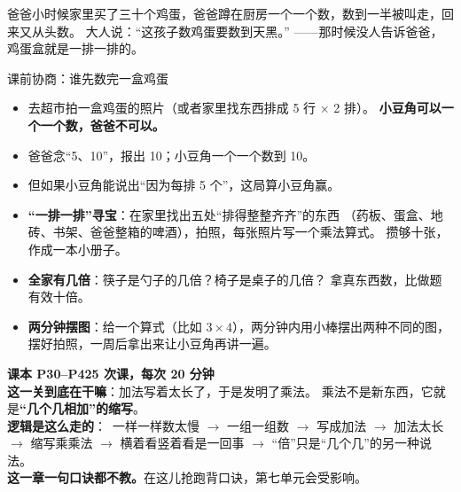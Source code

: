
\begin{blunder}
爸爸小时候家里买了三十个鸡蛋，爸爸蹲在厨房一个一个数，数到一半被叫走，回来又从头数。
大人说：“这孩子数鸡蛋要数到天黑。”
——那时候没人告诉爸爸，鸡蛋盒就是一排一排的。
\end{blunder}

\begin{gamble}{课前协商：谁先数完一盒鸡蛋}
\begin{itemize}
  \item 去超市拍一盒鸡蛋的照片（或者家里找东西排成 5 行 $\times$ 2 排）。
        \textbf{小豆角可以一个一个数，爸爸不可以。}
  \item 爸爸念“5、10”，报出 10；小豆角一个一个数到 10。
  \item 但如果小豆角能说出“因为每排 5 个”，这局算小豆角赢。
\end{itemize}
\negolines
\end{gamble}

\begin{bonus}
\begin{itemize}
  \item \textbf{“一排一排”寻宝}：在家里找出五处“排得整整齐齐”的东西
        （药板、蛋盒、地砖、书架、爸爸整箱的啤酒），拍照，每张照片写一个乘法算式。
        攒够十张，作成一本小册子。
  \item \textbf{全家有几倍}：筷子是勺子的几倍？椅子是桌子的几倍？
        拿真东西数，比做题有效十倍。
  \item \textbf{两分钟摆图}：给一个算式（比如 $3\times4$），两分钟内用小棒摆出两种不同的图，
        摆好拍照，一周后拿出来让小豆角再讲一遍。
\end{itemize}
\end{bonus}

\begin{unitinfo}
\textbf{课本 P30--P42}\quad \textbf{5 次课，每次 20 分钟} \\[4pt]
\textbf{这一关到底在干嘛}：加法写着太长了，于是发明了乘法。
乘法不是新东西，它就是\textbf{“几个几相加”的缩写}。\\
\textbf{逻辑是这么走的}：\ 一样一样数太慢 $\to$ 一组一组数 $\to$ 写成加法
$\to$ 加法太长 $\to$ 缩写乘乘法 $\to$ 横着看竖着看是一回事 $\to$
“倍”只是“几个几”的另一种说法。\\
\textbf{这一章一句口诀都不教。}在这儿抢跑背口诀，第七单元会受影响。
\end{unitinfo}

